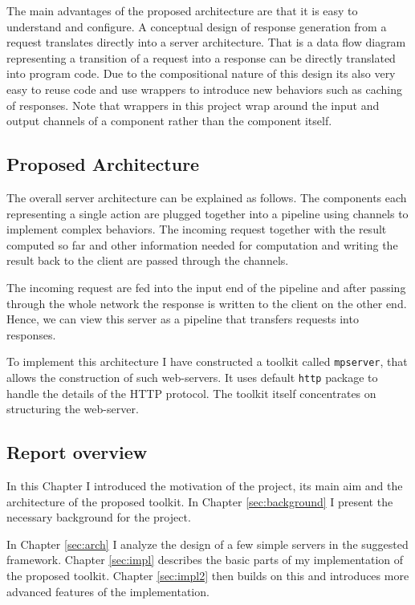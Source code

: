 \documentclass[12pt,a4paper]{article}
\begin{document}
The main advantages of the proposed architecture are that it is easy to understand
and configure. A conceptual design of response generation from a request translates 
directly into a server architecture. That is a data flow diagram representing a transition
of a request into a response can be directly translated into program code.
Due to the compositional nature of this design its also very easy to reuse code
and use wrappers to introduce new behaviors such as caching of responses.
Note that wrappers in this project wrap around the input and output channels
of a component rather than the component itself.

\subsection{Proposed Architecture}
The overall server architecture can be explained as follows.
The components each representing a single action are plugged together into 
a pipeline using channels to implement complex behaviors. The incoming
request together with the result computed so far and other 
information needed for computation and writing the result back to the client
are passed through the channels.

The incoming request are fed into the input end of the pipeline and 
after passing through the whole network the response is written to the
client on the other end. Hence, we can view this server
as a pipeline that transfers requests into responses.

To implement this architecture I have constructed a toolkit called 
\texttt{mpserver}, that allows the construction of such web-servers.
It uses default \texttt{http} package to handle the details of
the HTTP protocol. The toolkit itself concentrates on structuring the 
web-server.

\subsection{Report overview}
In this Chapter I introduced the motivation of the project, its main
aim and the architecture of the proposed toolkit. In Chapter \ref{sec:background} 
I present the necessary background for the project.

In Chapter \ref{sec:arch} I analyze the design of a few simple servers
in the suggested framework. Chapter \ref{sec:impl} describes the basic parts of 
my implementation of the proposed toolkit. Chapter \ref{sec:impl2} then builds
on this and introduces more advanced features of the implementation.
\end{document}
